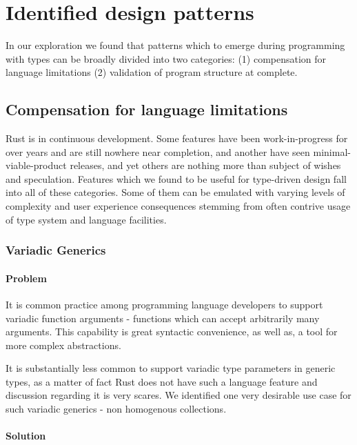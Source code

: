 \section{Identified design patterns}

In our exploration we found that patterns which to emerge during programming with types can be broadly divided into two categories: (1) compensation for language limitations (2) validation of program structure at complete.

\subsection{Compensation for language limitations}

Rust is in continuous development. Some features have been work-in-progress for over years and are still nowhere near completion, and another have seen minimal-viable-product releases, and yet others are nothing more than subject of wishes and speculation. 
Features which we found to be useful for type-driven design fall into all of these categories. Some of them can be emulated with varying levels of complexity and user experience consequences stemming from often contrive usage of type system and language facilities.

\subsubsection{Variadic Generics}

\paragraph{Problem}

It is common practice among programming language developers to support variadic function arguments - functions which can accept arbitrarily many arguments.
This capability is great syntactic convenience, as well as, a tool for more complex abstractions.

It is substantially less common to support variadic type parameters in generic types, as a matter of fact Rust does not have such a language feature and discussion regarding it is very scares.
We identified one very desirable use case for such variadic generics - non homogenous collections. 

\paragraph{Solution}

